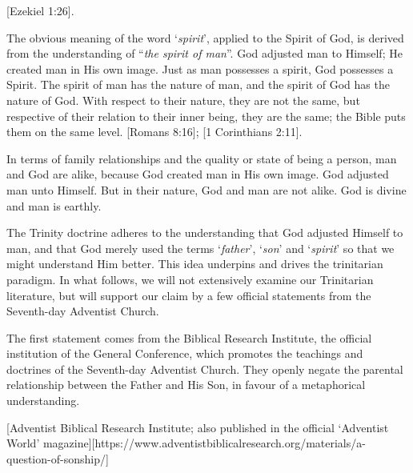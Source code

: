 [Ezekiel 1:26].

The obvious meaning of the word ‘\textit{spirit}’, applied to the Spirit of God, is derived from the understanding of “\textit{the spirit of man}”. God adjusted man to Himself; He created man in His own image. Just as man possesses a spirit, God possesses a Spirit. The spirit of man has the nature of man, and the spirit of God has the nature of God. With respect to their nature, they are not the same, but respective of their relation to their inner being, they are the same; the Bible puts them on the same level. [Romans 8:16]; [1 Corinthians 2:11].

In terms of family relationships and the quality or state of being a person, man and God are alike, because God created man in His own image. God adjusted man unto Himself. But in their nature, God and man are not alike. God is divine and man is earthly.

The Trinity doctrine adheres to the understanding that God adjusted Himself to man, and that God merely used the terms ‘\textit{father}’, ‘\textit{son}’ and ‘\textit{spirit}’ so that we might understand Him better. This idea underpins and drives the trinitarian paradigm. In what follows, we will not extensively examine our Trinitarian literature, but will support our claim by a few official statements from the Seventh-day Adventist Church. 

The first statement comes from the Biblical Research Institute, the official institution of the General Conference, which promotes the teachings and doctrines of the Seventh-day Adventist Church. They openly negate the parental relationship between the Father and His Son, in favour of a metaphorical understanding.

[Adventist Biblical Research Institute; also published in the official ‘Adventist World’ magazine][https://www.adventistbiblicalresearch.org/materials/a-question-of-sonship/]

